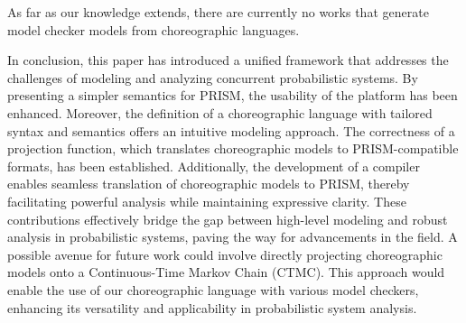 As far as our knowledge extends, there are currently no works that generate model checker models from choreographic languages.

In conclusion, this paper has introduced a unified framework that addresses the challenges of modeling and analyzing concurrent probabilistic systems. By presenting a simpler semantics for PRISM, the usability of the platform has been enhanced. Moreover, the definition of a choreographic language with tailored syntax and semantics offers an intuitive modeling approach. The correctness of a projection function, which translates choreographic models to PRISM-compatible formats, has been established. Additionally, the development of a compiler enables seamless translation of choreographic models to PRISM, thereby facilitating powerful analysis while maintaining expressive clarity. These contributions effectively bridge the gap between high-level modeling and robust analysis in probabilistic systems, paving the way for advancements in the field. 
A possible avenue for future work could involve directly projecting choreographic models onto a Continuous-Time Markov Chain (CTMC). This approach would enable the use of our choreographic language with various model checkers, enhancing its versatility and applicability in probabilistic system analysis.
